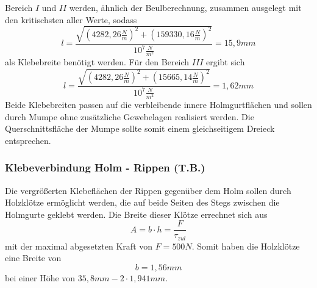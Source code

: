 \noindent Bereich $I$ und $II$ werden, ähnlich der Beulberechnung, zusammen ausgelegt mit den kritischsten aller Werte, sodass 
\begin{equation}
	l=\frac{\sqrt{(4282,26\frac{N}{m})^{2}+(159330,16\frac{N}{m})^{2}}}{10^{7}\frac{N}{m^{2}}}=15,9mm
\end{equation}
als Klebebreite benötigt werden. Für den Bereich $III$ ergibt sich
\begin{equation}
	l=\frac{\sqrt{(4282,26\frac{N}{m})^{2}+(15665,14\frac{N}{m})^{2}}}{10^{7}\frac{N}{m^{2}}}=1,62mm
\end{equation}
Beide Klebebreiten passen auf die verbleibende innere Holmgurtflächen und sollen durch Mumpe ohne zusätzliche Gewebelagen realisiert werden. Die Querschnittsfläche der Mumpe sollte somit einem gleichseitigem Dreieck entsprechen.

\subsubsection{Klebeverbindung Holm - Rippen (T.B.)}
Die vergrößerten Klebeflächen der Rippen gegenüber dem Holm sollen durch Holzklötze ermöglicht werden, die auf beide Seiten des Stegs zwischen die Holmgurte geklebt werden. Die Breite dieser Klötze errechnet sich aus 
\begin{equation}
	A=b\cdot h=\frac{F}{\tau_{zul}}
\end{equation}
mit der maximal abgesetzten Kraft von $F=500N$.
Somit haben die Holzklötze eine Breite von 
\begin{equation}
	b=1,56mm
\end{equation}
bei einer Höhe von $35,8mm-2\cdot 1,941mm$.